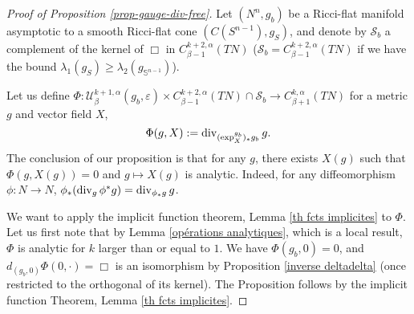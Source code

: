 \documentclass[a4paper,11pt,reqno]{amsart}
\def\div{\mathop{\rm div}\nolimits}
\def\div{\mathop{\rm div}\nolimits}
\numberwithin{equation}{section}
\begin{document}
	\begin{proof}[Proof of Proposition \ref{prop-gauge-div-free}]
		Let $(N^n,g_b)$ be a Ricci-flat manifold asymptotic to a smooth Ricci-flat cone $(C(S^{n-1}),g_S)$, and denote by $\mathcal{S}_b$ a complement of the kernel of $\Box$ in $C^{k+2,\alpha}_{\beta-1}(TN)$ ($\mathcal{S}_b= C^{k+2,\alpha}_{\beta-1}(TN)$ if we have the bound $\lambda_1(g_S)\geq \lambda_2(g_{\mathbb{S}^{n-1}})$).
		
		Let us define $\Phi :  \mathcal{U}^{k+1,\alpha}_{\beta}(g_b,\varepsilon)\times C^{k+2,\alpha}_{\beta-1}(TN)\cap\mathcal{S}_b\to C^{k,\alpha}_{\beta+1}(TN)$ for a metric $g$ and vector field $X$,
		$$\Phi(g,X):= \div_{(\exp_X^{g_b})_*g_b}g.$$
		The conclusion of our proposition is that for any $g$, there exists $X(g)$ such that $\Phi(g,X(g))= 0$ and $g\mapsto X(g)$ is analytic. Indeed, for any diffeomorphism $\phi:N\to N$, $\phi_*(\div_{g}\phi^* g) = \div_{\phi_*g}g$.
		
		We want to apply the implicit function theorem, Lemma \ref{th fcts implicites} to $\Phi$. Let us first note that by Lemma \ref{opérations analytiques}, which is a local result, $\Phi$ is analytic for $k$ larger than or equal to $1$. We have $\Phi(g_b,0)= 0$, and $d_{(g_b,0)}\Phi(0,\cdot)= \Box$ is an isomorphism by Proposition \ref{inverse deltadelta} (once restricted to the orthogonal of its kernel). The Proposition follows by the implicit function Theorem, Lemma \ref{th fcts implicites}.
	\end{proof}
	
\end{document}
